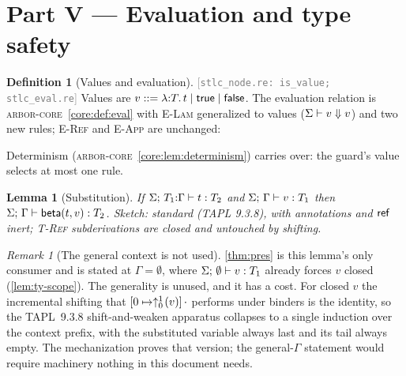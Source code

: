 \documentclass[11pt]{article}
\theoremstyle{definition}
\newtheorem{definition}{Definition}[section]
\theoremstyle{plain}
\newtheorem{lemma}[theorem]{Lemma}
\theoremstyle{remark}
\newtheorem{remark}{Remark}[section]
\newcommand{\src}[1]{{\footnotesize\textcolor{gray}{[\texttt{#1}]}}}
\newcommand{\arborcore}{\textsc{arbor-core}}
\newcommand{\coreref}[1]{\arborcore~\cref{core:#1}}
\begin{document}
\section{Part V --- Evaluation and type safety}\label{sec:eval}

\begin{definition}[Values and evaluation]\label{def:value}
\src{stlc\_node.re: is\_value; stlc\_eval.re} Values are
$v ::= \lambda{:}T.\,t \mid \mathsf{true} \mid \mathsf{false}$. The evaluation relation is
\coreref{def:eval} with \textsc{E-Lam} generalized to values ($\Sigma \vdash v \Downarrow v$)
and two new rules; \textsc{E-Ref} and \textsc{E-App} are unchanged:
Determinism (\coreref{lem:determinism}) carries over: the guard's value selects at most one
rule.
\end{definition}

\begin{lemma}[Substitution]\label{lem:subst}
If $\Sigma;\,T_1{:}\Gamma \vdash t : T_2$ and $\Sigma;\,\Gamma \vdash v : T_1$ then
$\Sigma;\,\Gamma \vdash \mathsf{beta}(t,v) : T_2$. \emph{Sketch:} standard (TAPL 9.3.8),
with annotations and $\mathsf{ref}\,$ inert; \textsc{T-Ref} subderivations are closed and
untouched by shifting.
\end{lemma}

\begin{remark}[The general context is not used]\label{rem:subst-empty}
\cref{thm:pres} is this lemma's only consumer and is stated at $\Gamma = \emptyset$, where
$\Sigma;\,\emptyset \vdash v : T_1$ already forces $v$ closed (\cref{lem:ty-scope}). The
generality is unused, and it has a cost. For closed $v$ the incremental shifting that
$[0 \mapsto \uparrow^{1}_{0}\!\left(v\right)]\,\cdot$ performs under binders is the identity, so the
TAPL~9.3.8 shift-and-weaken apparatus collapses to a single induction over the context
prefix, with the substituted variable always last and its tail always empty. The
mechanization proves that version; the general-$\Gamma$ statement would require machinery
nothing in this document needs.
\end{remark}
\end{document}
